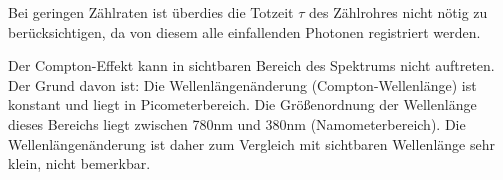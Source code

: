 Bei geringen Zählraten ist überdies die Totzeit $\tau$ des Zählrohres nicht nötig zu berücksichtigen, da von diesem alle einfallenden Photonen registriert werden.

Der Compton-Effekt kann in sichtbaren Bereich des Spektrums nicht auftreten. Der Grund davon ist:
Die Wellenlängenänderung (Compton-Wellenlänge) ist konstant und liegt in Picometerbereich.
Die Größenordnung der Wellenlänge dieses Bereichs liegt zwischen 780nm und 380nm (Namometerbereich).
Die Wellenlängenänderung ist daher zum Vergleich mit sichtbaren Wellenlänge sehr klein, nicht bemerkbar.

